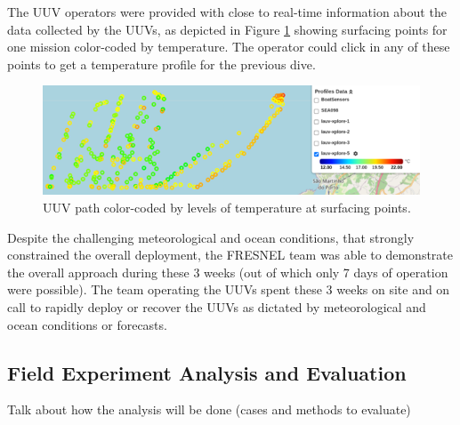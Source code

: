 The UUV operators were provided with close to real-time information about the data collected by the UUVs, as depicted in Figure \ref{fig:temperatureprofiles} showing surfacing points for one mission color-coded by temperature. The operator could click in any of these points to get a temperature profile for the previous dive.

 \begin{figure}
    \centering
    \includegraphics[width=.7\linewidth]{fig/temperatureprofiles.png}
    \caption{UUV path color-coded by levels of temperature at surfacing points.}
    \label{fig:temperatureprofiles}
\end{figure}



Despite the challenging meteorological and ocean conditions, that strongly constrained the overall deployment, the FRESNEL team was able to demonstrate the overall approach during these 3 weeks (out of which only 7 days of operation were possible). The team operating the UUVs spent these 3 weeks on site and on call to rapidly deploy or recover the UUVs as dictated by meteorological and ocean conditions or forecasts. 



\subsection{Field Experiment Analysis and Evaluation}

Talk about how the analysis will be done (cases and methods to evaluate)



    


